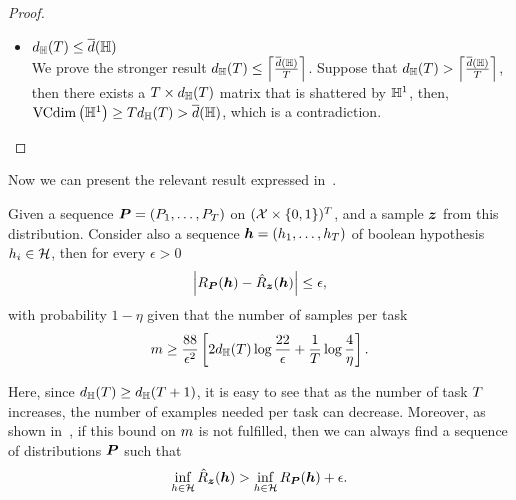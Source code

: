 \begin{proof}
\begin{itemize}
        \item  $ d_\hypspacef(\ntasks) \leq \overline{d}(\hypspacef)$ \\
        We prove the stronger result $ d_\hypspacef(\ntasks) \leq \ceil*{\frac{\overline{d}(\hypspacef)}{\ntasks}} $. Suppose that $ d_\hypspacef(\ntasks) > \ceil*{\frac{\overline{d}(\hypspacef)}{\ntasks}} $, then there exists a $\ntasks \times d_\hypspacef(\ntasks)$ matrix that is shattered by $\hypspacef^1$, then, $\vcdim{\hypspacef^1} \geq \ntasks  d_\hypspacef(\ntasks) > \overline{d}(\hypspacef)$, which is a contradiction.

    \end{itemize}
\end{proof}


Now we can present the relevant result expressed in~\cite[Corollary~13]{baxter2000model}.
\begin{theorem}\label{th:baxter_vcdim}
    Given a sequence $\bprobseq = (P_1, \ldots, P_\ntasks)$ on $(\Xspace \times \set{0, 1})^\ntasks$, and a sample $\bsample$ from this distribution. Consider also a sequence $\myvec{\hypf} = (\hypf_1, \ldots, \hypf_\ntasks)$ of boolean hypothesis $\hypf_i \in \hypspace$, then for every $\epsilon > 0$
\begin{equation}
    \nonumber
    \abs{\risk_{\bprobseq}(\myvec{\hypf}) - \bemprisk(\myvec{\hypf})} \leq \epsilon,
\end{equation}
with probability $1 - \eta$ given that the number of samples per task
\begin{equation}
    \label{eq:bound_npertask_genvcdim}
    \npertask \geq \frac{88}{\epsilon^2} \left[2 d_\hypspacef(\ntasks) \log \frac{22}{\epsilon} + \frac{1}{\ntasks}\log\frac{4}{\eta} \right] .
\end{equation}
\end{theorem}
Here, since $d_\hypspacef(\ntasks) \geq d_\hypspacef(\ntasks+1)$, it is easy to see that as the number of task $\ntasks$ increases, the number of examples needed per task can decrease. 
Moreover, as shown in~\cite[Theorem~14]{baxter2000model}, if this bound on $\npertask$ is not fulfilled, then we can always find a sequence of distributions $\bprobseq$ such that
\begin{equation}
    \nonumber
    \inf_{\hypf \in \hypspace} \bemprisk(\myvec{\hypf}) > \inf_{\hypf \in \hypspace} \risk_{\bprobseq}(\myvec{\hypf}) + \epsilon .
\end{equation}
